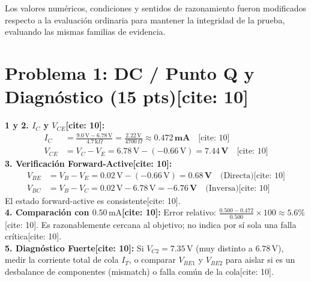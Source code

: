 \documentclass[11pt, a4paper]{article}
\begin{document}
\begin{tcolorbox}[colback=red!5, colframe=red!70!black, title=\textbf{Material Reservado Docente: Solucionario Evaluación Diferida EC2}]
    Los valores numéricos, condiciones y sentidos de razonamiento fueron modificados respecto a la evaluación ordinaria para mantener la integridad de la prueba, evaluando las mismas familias de evidencia.
\end{tcolorbox}

\section*{Problema 1: DC / Punto Q y Diagnóstico (15 pts)[cite: 10]}
\textbf{1 y 2. $I_C$ y $V_{CE}$[cite: 10]:}
\begin{align*}
    I_C &= \frac{9.0\,\text{V} - 6.78\,\text{V}}{4.7\,\text{k}\Omega} = \frac{2.22\,\text{V}}{4700\,\Omega} \approx \mathbf{0.472\,\text{mA}} \quad \text{[cite: 10]} \\
    V_{CE} &= V_C - V_E = 6.78\,\text{V} - (-0.66\,\text{V}) = \mathbf{7.44\,\text{V}} \quad \text{[cite: 10]}
\end{align*}
\textbf{3. Verificación Forward-Active[cite: 10]:}
\begin{align*}
    V_{BE} &= V_B - V_E = 0.02\,\text{V} - (-0.66\,\text{V}) = \mathbf{0.68\,\text{V}} \quad \text{(Directa)[cite: 10]} \\
    V_{BC} &= V_B - V_C = 0.02\,\text{V} - 6.78\,\text{V} = \mathbf{-6.76\,\text{V}} \quad \text{(Inversa)[cite: 10]}
\end{align*}
El estado forward-active es consistente[cite: 10]. \\
\textbf{4. Comparación con $0.50\,\text{mA}$[cite: 10]:} Error relativo: $\frac{0.500 - 0.472}{0.500} \times 100 \approx \mathbf{5.6\%}$[cite: 10]. Es razonablemente cercana al objetivo; no indica por sí sola una falla crítica[cite: 10]. \\
\textbf{5. Diagnóstico Fuerte[cite: 10]:} Si $V_{C2}=7.35\,\text{V}$ (muy distinto a $6.78\,\text{V}$), medir la corriente total de cola $I_T$, o comparar $V_{BE1}$ y $V_{BE2}$ para aislar si es un desbalance de componentes (mismatch) o falla común de la cola[cite: 10].
\end{document}
